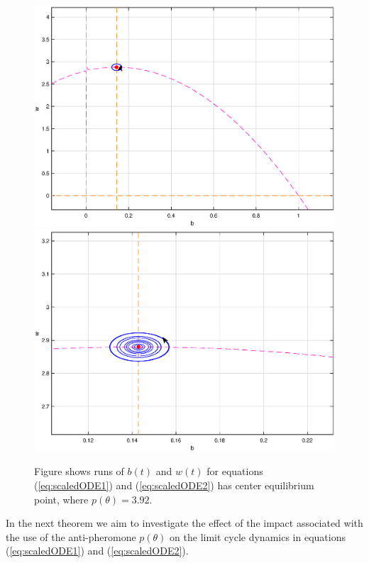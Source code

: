 \documentclass[12pt]{article}
\begin{document}
\begin{figure}[!htp]
\begin{center}
\includegraphics[scale=0.28]{img/l1.eps}  
\includegraphics[scale=0.28]{img/l2.eps}

\end{center}

\caption{Figure shows runs of $b(t)$ and $w(t)$ for equations
  (\ref{eq:scaledODE1}) and (\ref{eq:scaledODE2}) has center
  equilibrium point, where $p(\theta )=3.92$. }
      \label{fig:l1l2}
\end{figure}

In the next theorem we aim to investigate the effect of the impact
associated with the use of the anti-pheromone $p(\theta )$ on
the limit cycle dynamics in equations (\ref{eq:scaledODE1}) and
(\ref{eq:scaledODE2}).
\end{document}
